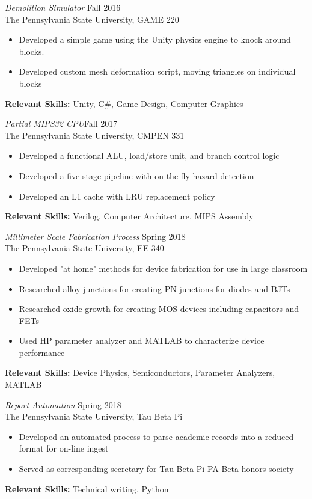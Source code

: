 \documentclass[line,margin]{res}
\begin{document}
\begin{resume}
		{\sl Demolition Simulator} \hfill Fall 2016\\
		The Pennsylvania State University, GAME 220
		\begin{itemize}  \itemsep -2pt
			\item Developed a simple game using the Unity physics engine to knock around blocks.
			\item Developed custom mesh deformation script, moving triangles on individual blocks
			\vspace*{-\baselineskip}		
		\end{itemize}
		\textbf{Relevant Skills:} Unity, C\#, Game Design, Computer Graphics
		
		{\sl Partial MIPS32 CPU}\hfill Fall 2017\\
		The Pennsylvania State University, CMPEN 331
		\begin{itemize}  \itemsep -2pt
			\item Developed a functional ALU, load/store unit, and branch control logic
			\item Developed a five-stage pipeline with on the fly hazard detection
			\item Developed an L1 cache with LRU replacement policy
			\vspace*{-\baselineskip}		
		\end{itemize}
		\textbf{Relevant Skills:} Verilog, Computer Architecture, MIPS Assembly 
		
		{\sl Millimeter Scale Fabrication Process} \hfill Spring 2018\\
		The Pennsylvania State University, EE 340
		\begin{itemize}  \itemsep -2pt
			\item Developed "at home" methods for device fabrication for use in large classroom
			\item Researched alloy junctions for creating PN junctions for diodes and BJTs
			\item Researched oxide growth for creating MOS devices including capacitors and FETs
			\item Used HP parameter analyzer and MATLAB to characterize device performance	
			\vspace*{-\baselineskip}		
		\end{itemize}
		\textbf{Relevant Skills:} Device Physics, Semiconductors, Parameter Analyzers, MATLAB
		
		{\sl Report Automation} \hfill Spring 2018\\
		The Pennsylvania State University, Tau Beta Pi
		\begin{itemize}  \itemsep -2pt
			\item Developed an automated process to parse academic records into a reduced format for on-line ingest
			\item Served as corresponding secretary for Tau Beta Pi PA Beta honors society
			\vspace*{-\baselineskip}		
		\end{itemize}
		\textbf{Relevant Skills:} Technical writing, Python
		

\end{resume}
\end{document}

